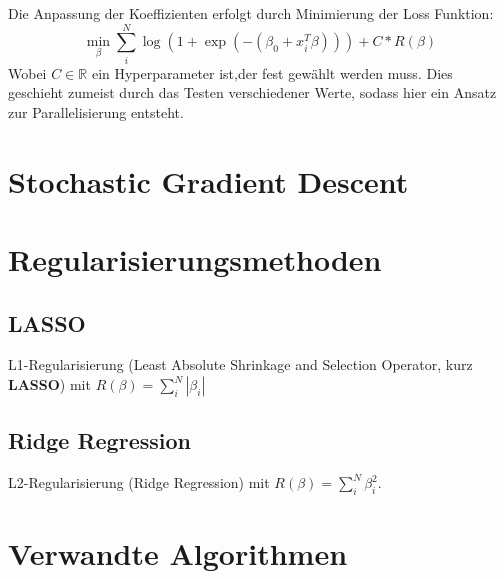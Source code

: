 Die Anpassung der Koeffizienten erfolgt durch Minimierung der Loss Funktion: \begin{displaymath}
\min_\beta \sum_{i}^N \log(1+\exp(-(\beta_0+x_i^T\beta))) +C*R(\beta)
\end{displaymath}
Wobei $C \in \mathbb R$ ein Hyperparameter ist,der fest gewählt werden muss. Dies geschieht zumeist durch das Testen verschiedener Werte, sodass hier ein Ansatz zur Parallelisierung entsteht.
\section{Stochastic Gradient Descent}
\section{Regularisierungsmethoden}
\subsection{LASSO}
L1-Regularisierung (Least Absolute Shrinkage and Selection Operator, kurz \textbf{LASSO}) mit $R(\beta) = \sum_{i}^N|\beta_i|$
\subsection{Ridge Regression}
L2-Regularisierung (Ridge Regression) mit $R(\beta)= \sum_{i}^N \beta_i^2$.
\section{Verwandte Algorithmen}